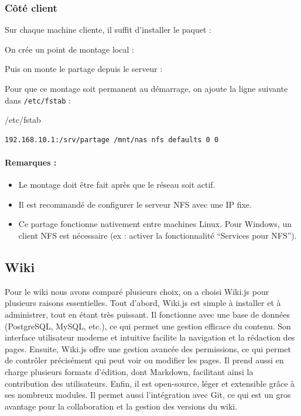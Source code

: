 \documentclass{article}
\begin{document}
\subsubsection{Côté client}

Sur chaque machine cliente, il suffit d’installer le paquet :

On crée un point de montage local :

Puis on monte le partage depuis le serveur :

Pour que ce montage soit permanent au démarrage, on ajoute la ligne suivante dans \texttt{/etc/fstab} :
\begin{configbox}{/etc/fstab}
\begin{lstlisting}
192.168.10.1:/srv/partage /mnt/nas nfs defaults 0 0
\end{lstlisting}
\end{configbox}

\paragraph{Remarques :}
\begin{itemize}
    \item Le montage doit être fait après que le réseau soit actif.
    \item Il est recommandé de configurer le serveur NFS avec une IP fixe.
    \item Ce partage fonctionne nativement entre machines Linux. Pour Windows, un client NFS est nécessaire (ex : activer la fonctionnalité ``Services pour NFS'').
\end{itemize}




\subsection{Wiki}

Pour le wiki nous avons comparé plusieurs choix, on a choisi Wiki.js pour plusieurs raisons essentielles.
Tout d’abord, Wiki.js est simple à installer et à administrer, tout en étant très puissant. Il fonctionne avec une base de données (PostgreSQL, MySQL, etc.), ce qui permet une gestion efficace du contenu. Son interface utilisateur moderne et intuitive facilite la navigation et la rédaction des pages.
Ensuite, Wiki.js offre une gestion avancée des permissions, ce qui permet de contrôler précisément qui peut voir ou modifier les pages. Il prend aussi en charge plusieurs formats d’édition, dont Markdown, facilitant ainsi la contribution des utilisateurs.
Enfin, il est open-source, léger et extensible grâce à ses nombreux modules. Il permet aussi l’intégration avec Git, ce qui est un gros avantage pour la collaboration et la gestion des versions du wiki.
\end{document}
